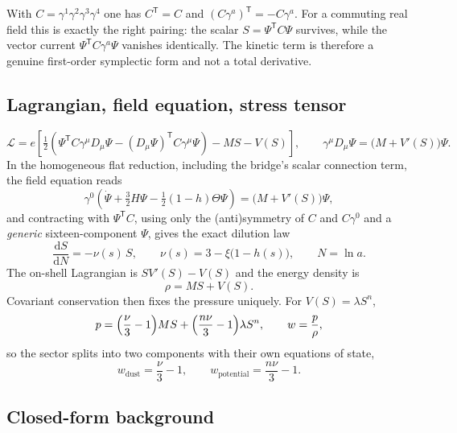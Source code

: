 \documentclass[11pt]{article}
\newcommand{\dd}{\mathrm{d}}
\begin{document}
With $C=\gamma^1\gamma^2\gamma^3\gamma^4$ one has $C^{\mathsf T}=C$ and
$(C\gamma^a)^{\mathsf T}=-C\gamma^a$. For a commuting real field this is exactly
the right pairing: the scalar $S=\Psi^{\mathsf T}C\Psi$ survives, while the
vector current $\Psi^{\mathsf T}C\gamma^a\Psi$ vanishes identically. The kinetic
term is therefore a genuine first-order symplectic form and not a total
derivative.

\subsection{Lagrangian, field equation, stress tensor}

\begin{equation}
  \mathcal L = e\left[\tfrac12\left(
  \Psi^{\mathsf T}C\gamma^\mu D_\mu\Psi
  - (D_\mu\Psi)^{\mathsf T}C\gamma^\mu\Psi\right)
  - MS - V(S)\right],
  \qquad
  \gamma^\mu D_\mu\Psi = \bigl(M+V'(S)\bigr)\Psi .
\end{equation}
In the homogeneous flat reduction, including the bridge's scalar connection
term, the field equation reads
\begin{equation}
  \gamma^0\!\left(\dot\Psi + \tfrac32H\Psi - \tfrac12(1-h)\Theta\Psi\right)
  = \bigl(M+V'(S)\bigr)\Psi ,
\end{equation}
and contracting with $\Psi^{\mathsf T}C$, using only the (anti)symmetry of $C$
and $C\gamma^0$ and a \emph{generic} sixteen-component $\Psi$, gives the exact
dilution law
\begin{equation}
  \frac{\dd S}{\dd N} = -\nu(s)\,S,
  \qquad
  \nu(s) = 3-\xi\bigl(1-h(s)\bigr),
  \qquad N=\ln a .
  \label{eq:dilution}
\end{equation}
The on-shell Lagrangian is $SV'(S)-V(S)$ and the energy density is
\begin{equation}
  \rho = M S + V(S).
\end{equation}
Covariant conservation then fixes the pressure uniquely. For $V(S)=\lambda S^n$,
\begin{equation}
  p = \Bigl(\frac{\nu}{3}-1\Bigr)MS
    + \Bigl(\frac{n\nu}{3}-1\Bigr)\lambda S^{n},
  \qquad
  w=\frac{p}{\rho},
\end{equation}
so the sector splits into two components with their own equations of state,
\begin{equation}
  w_{\mathrm{dust}} = \frac{\nu}{3}-1,
  \qquad
  w_{\mathrm{potential}} = \frac{n\nu}{3}-1 .
\end{equation}

\subsection{Closed-form background}
\end{document}
